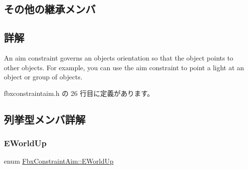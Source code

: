 \subsection*{その他の継承メンバ}


\subsection{詳解}
An aim constraint governs an object\textquotesingle{}s orientation so that the object points to other objects. For example, you can use the aim constraint to point a light at an object or group of objects. 

 fbxconstraintaim.\+h の 26 行目に定義があります。



\subsection{列挙型メンバ詳解}
\mbox{\label{class_fbx_constraint_aim_a90316b1564490f5dd0b24e552fe6e637}} 
\subsubsection{\texorpdfstring{E\+World\+Up}{EWorldUp}}
{\footnotesize\ttfamily enum \hyperlink{class_fbx_constraint_aim_a90316b1564490f5dd0b24e552fe6e637}{Fbx\+Constraint\+Aim\+::\+E\+World\+Up}}

